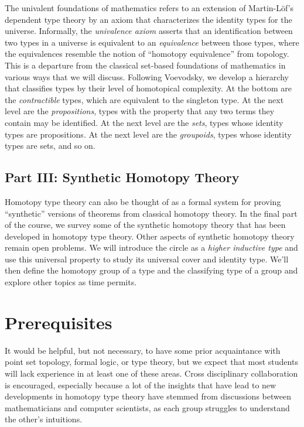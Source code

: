 \documentclass{amsart}
\theoremstyle{definition}
\theoremstyle{remark}
\numberwithin{equation}{section}
\begin{document}
The univalent foundations of mathematics refers to an extension of Martin-L\"{o}f's dependent type theory by an axiom that characterizes the identity types for the universe. Informally, the \emph{univalence axiom} asserts that an identification between two types in a universe is equivalent to an \emph{equivalence} between those types, where the equivalences resemble the notion of ``homotopy equivalence'' from topology. This is a departure from the classical set-based foundations of mathematics in various ways that we will discuss. Following Voevodsky, we develop a hierarchy that classifies types by their level of homotopical complexity. At the bottom are the \emph{contractible} types, which are equivalent to the singleton type. At the next level are the \emph{propositions}, types with the property that any two terms they contain may be identified. At the next level are the \emph{sets}, types whose identity types are propositions. At the next level are the \emph{groupoids}, types whose identity types are sets, and so on.

\subsection*{Part III: Synthetic Homotopy Theory}

Homotopy type theory can also be thought of as a formal system for proving ``synthetic'' versions of theorems from classical homotopy theory. In the final part of the course, we survey some of the synthetic homotopy theory that has been developed in homotopy type theory. Other aspects of synthetic homotopy theory remain open problems. We will introduce the circle as a \emph{higher inductive type} and use this universal property to study its universal cover and identity type.  We'll then define the homotopy group of a type and the classifying type of a group and explore other topics as time permits.

\section*{Prerequisites} 

It would be helpful, but not necessary, to have some prior acquaintance with point set topology, formal logic, or type theory, but we expect that most students will lack experience in at least one of these areas. Cross disciplinary collaboration is encouraged, especially because a lot of the insights that have lead to new developments in homotopy type theory have stemmed from discussions between mathematicians and computer scientists, as each group struggles to understand the other's intuitions.
\end{document}

